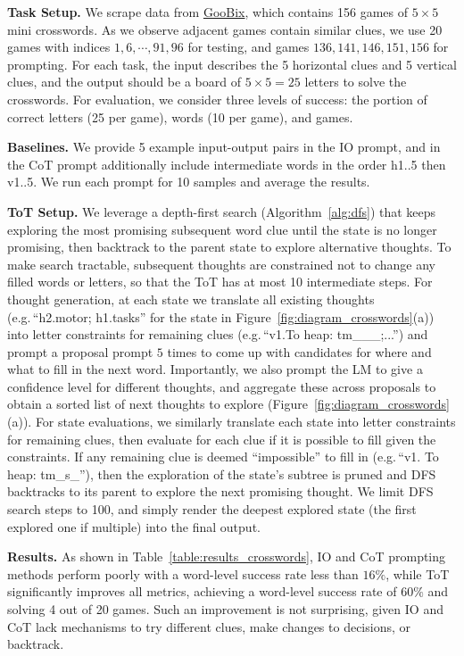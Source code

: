\documentclass{article}
\begin{document}
\textbf{Task Setup.} We scrape data from \href{https://www.goobix.com/crosswords/0505/}{GooBix}, which contains 156 games of $5\times 5$ mini crosswords. As we observe adjacent games contain similar clues, we use 20 games with indices $1, 6, \cdots, 91, 96$ for testing, and games $136, 141,146,151,156$ for prompting.
For each task, the input describes the 5 horizontal clues and 5 vertical clues, and the output should be a board of $5 \times 5 = 25$ letters to solve the crosswords. For evaluation, we consider three levels of success: the portion of correct letters (25 per game), words (10 per game), and games. 

\textbf{Baselines.} We provide 5 example input-output pairs in the IO prompt, and in the CoT prompt additionally include intermediate words in the order h1..5 then v1..5. We run each prompt for 10 samples and average the results.

\textbf{ToT Setup.} We leverage a depth-first search (Algorithm~\ref{alg:dfs}) that keeps exploring the most promising subsequent word clue until the state is no longer promising, then backtrack to the parent state to explore alternative thoughts.
To make search tractable, subsequent thoughts are constrained not to change any filled words or letters, so that the ToT has at most 10 intermediate steps. 
For thought generation, at each state we translate all existing thoughts (e.g.\,``h2.motor; h1.tasks'' for the state in Figure~\ref{fig:diagram_crosswords}(a)) into letter constraints for remaining clues (e.g.\,``v1.To heap: tm\_\_\_;...'') and  prompt a proposal prompt $5$ times to come up with candidates for where and what to fill in the next word. Importantly, we also prompt the LM to give a confidence level for different thoughts, and aggregate these across proposals to obtain a sorted list of next thoughts to explore (Figure~\ref{fig:diagram_crosswords}(a)).
For state evaluations, we similarly translate each state into letter constraints for remaining clues, then evaluate for each clue if it is possible to fill given the constraints. If any remaining clue is deemed ``impossible'' to fill in (e.g.\,``v1. To heap: tm\_s\_''), then the exploration of the state's subtree is pruned and DFS backtracks to its parent to explore the next promising thought. We limit DFS search steps to 100, and simply render the deepest explored state (the first explored one if multiple) into the final output. 

\textbf{Results.} As shown in Table~\ref{table:results_crosswords}, IO and CoT prompting methods perform poorly with a word-level success rate less than $16\%$, while ToT significantly improves all metrics, achieving a word-level success rate of $60\%$ and solving 4 out of 20 games. Such an improvement is not surprising, given IO and CoT lack mechanisms to try different clues, make changes to decisions, or backtrack. %
\end{document}

